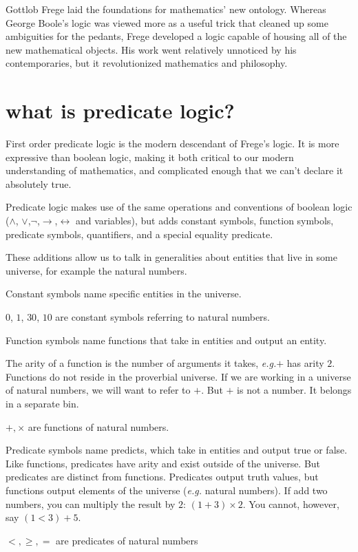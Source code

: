 \documentclass{scrbook}
\renewcommand{\implies}{\to}
\renewcommand{\iff}{\leftrightarrow}
\newcommand{\eg}{\emph{e.g.}\xspace}
\begin{document}
Gottlob Frege laid the foundations for mathematics' new ontology. Whereas George Boole's logic was viewed more as a useful trick that cleaned up some ambiguities for the pedants, Frege developed a logic capable of housing all of the new mathematical objects. His work went relatively unnoticed by his contemporaries, but it revolutionized mathematics and philosophy. 

\section[What is Predicate Logic?]{what is predicate logic?}\label{ch:pred}
First order predicate logic is the modern descendant of Frege's logic. It is more expressive than boolean logic, making it both critical to our modern understanding of mathematics, and complicated enough that we can't declare it absolutely true. 

Predicate logic makes use of the same operations and conventions of boolean logic ($\wedge$, $\vee$,$\neg$,$\implies$,$\iff$ and variables), but adds constant symbols, function symbols,  predicate symbols, quantifiers, and a special equality predicate. 

These additions allow us to talk in generalities about entities that live in some universe, for example the natural numbers. 

\begin{defn}
  Constant symbols name specific entities in the universe.
\begin{example}
  $0$, $1$, $30$, $10$ are constant symbols referring to natural numbers. 
\end{example}
\end{defn}

\begin{defn}
  Function symbols name functions that take in entities and output an
  entity.

  The arity of a function is the number of arguments it takes, \eg $+$ has arity $2$.
Functions do not reside in the proverbial universe. If we are working in a universe of natural numbers, we will want to refer to $+$. But $+$ is not a number. It belongs in a separate bin.
\end{defn}
\begin{example}
  $+,\times$ are functions of natural numbers. 
\end{example}
\begin{defn}
  Predicate symbols name predicts, which take in entities and output true or false.
Like functions, predicates have arity and exist outside of the universe. But predicates are distinct from functions. Predicates output truth values, but functions output elements of the universe (\eg natural numbers). If add two numbers, you can multiply the result by $2$: $(1+3)\times 2$. You cannot, however, say $(1<3)+5$. 
\end{defn}
\begin{example}
  $<,\geq,=$ are predicates of natural numbers
\end{example}
\end{document}
